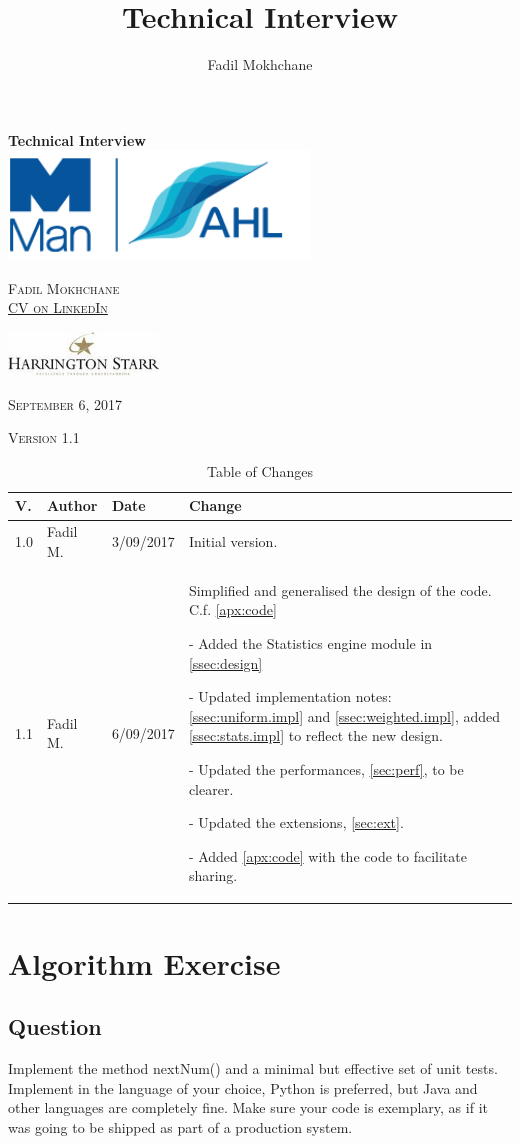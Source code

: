 \documentclass[12pt,a4paper,article]{memoir} %
\title{Technical Interview}
\author{Fadil Mokhchane}
\newlength\drop
\newcommand*\titleM{\begingroup%
\setlength\drop{0.08\textheight}
\centering
\vspace*{\drop}
{\Huge\bfseries Technical Interview}\\[\baselineskip]
\vfill
\includegraphics[width=0.6\textwidth]{img/logo.png}\par\vspace{1cm}
\vfill
{\Huge\scshape Fadil Mokhchane \\ 
\small \href{https://www.linkedin.com/in/fadil/}{CV on LinkedIn} }\par
\vspace{1cm}
\includegraphics[width=0.3\textwidth]{img/harrington.jpg}\par
\vfill
\vspace*{2\drop}
{\scshape September 6, 2017}\par
{\scshape \small Version 1.1}\par
\endgroup}
\begin{document}
\begin{titlingpage}
\titleM
\end{titlingpage}

\newpage
\tableofcontents* %
{}
\vfill


\begin{table}[h!]
  \centering
  \caption{Table of Changes}
  \begin{tabular}{lll p{}}
    \toprule
    V. & Author & Date & Change\\
    \midrule
    1.0 & Fadil M. & 3/09/2017 & 
    	Initial version. \\
    1.1 & Fadil M. & 6/09/2017 & 
    	Simplified and generalised the design of the code. 
    	C.f. \autoref{apx:code} 
    	
    	- Added the Statistics engine module in \autoref{ssec:design} 
    	
    	- Updated implementation notes: \autoref{ssec:uniform.impl}
    	 and \autoref{ssec:weighted.impl}, 
    	added \autoref{ssec:stats.impl} to reflect the new design.
    	
    	- Updated the performances, \autoref{sec:perf}, to be clearer.
    	
    	- Updated the extensions, \autoref{sec:ext}.
    	
    	- Added \autoref{apx:code} with the code to facilitate sharing.
    	\\
    \bottomrule
  \end{tabular}
\end{table}

\newpage
\listoffigures
\listoftables
\vfill
\newpage

\chapter{Algorithm Exercise}
\section{Question}
Implement the method nextNum() and a minimal but effective set of unit tests. 
Implement in the language of your choice, Python is preferred, but Java and 
other languages are completely fine. 
Make sure your code is exemplary, as if it was going to be shipped as part of a production system.
\end{document}
